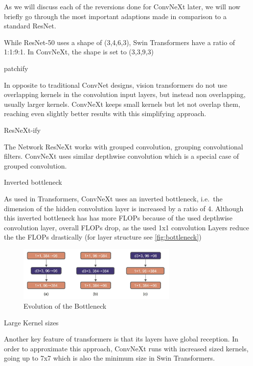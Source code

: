 \documentclass{article}
\begin{document}
As we will discuss each of the reversions done for ConvNeXt later, we will now briefly go through the most important adaptions made in comparison to a standard ResNet.

While ResNet-50 uses a shape of (3,4,6,3), Swin Transformers have a ratio of 1:1:9:1.
In ConvNeXt, the shape is set to (3,3,9,3)

patchify

In opposite to traditional ConvNet designs, vision transformers do not use overlapping kernels in the convolution input layers, but instead non overlapping, usually larger kernels.
ConvNeXt keeps small kernels but let not overlap them, reaching even slightly better results with this simplifying approach.

ResNeXt-ify

The Network ResNeXt works with grouped convolution, grouping convolutional filters.
ConvNeXt uses similar depthwise convolution which is a special case of grouped convolution.

Inverted bottleneck

As used in Transformers, ConvNeXt uses an inverted bottleneck, i.e.\ the dimension of the hidden convolution layer is increased by a ratio of 4.
Although this inverted bottleneck has has more FLOPs because of the used depthwise convolution layer, overall FLOPs drop, as the used 1x1 convolution Layers reduce the the FLOPs drastically (for layer structure see \autoref{fig:bottleneck})
\begin{figure}[h]
    \centering
    \includegraphics[width=0.7\textwidth]{images/bottleneck}
    \caption{Evolution of the Bottleneck}
    \label{fig:bottleneck}
\end{figure}

Large Kernel sizes

Another key feature of transformers is that its layers have global reception.
In order to approximate this approach, ConvNeXt runs with increased sized kernels, going up to 7x7 which is also the minimum size in Swin Transformers.
\end{document}
